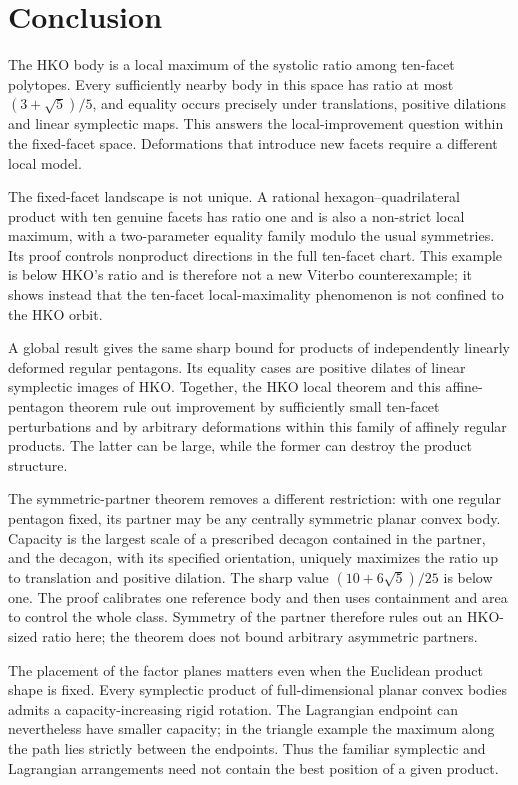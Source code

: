 \clearpage
\section{Conclusion}\label{sec:conclusion}

The HKO body is a local maximum of the systolic ratio among ten-facet
polytopes. Every sufficiently nearby body in this space has ratio at most
$(3+\sqrt5)/5$, and equality occurs precisely under translations, positive
dilations and linear symplectic maps. This answers the local-improvement
question within the fixed-facet space. Deformations that introduce new
facets require a different local model.

The fixed-facet landscape is not unique. A rational hexagon--quadrilateral
product with ten genuine facets has ratio one and is also a non-strict local
maximum, with a two-parameter equality family modulo the usual symmetries.
Its proof controls nonproduct directions in the full ten-facet chart. This
example is below HKO's ratio and is therefore not a new Viterbo counterexample;
it shows instead that the ten-facet local-maximality phenomenon is not confined
to the HKO orbit.

A global result gives the same sharp bound for products of independently
linearly deformed regular pentagons. Its equality cases are positive dilates
of linear symplectic images of HKO. Together, the HKO local theorem and this
affine-pentagon theorem rule out
improvement by sufficiently small ten-facet perturbations and by arbitrary
deformations within this family of affinely regular products. The latter
can be large, while the former can destroy the product structure.

The symmetric-partner theorem removes a different restriction: with one regular
pentagon fixed, its partner may be any centrally symmetric planar convex body.
Capacity is the largest scale of a prescribed decagon contained in the partner,
and the decagon, with its specified orientation, uniquely maximizes the ratio
up to translation and positive dilation. The sharp value $(10+6\sqrt5)/25$ is below one. The proof calibrates
one reference body and then uses containment and area to control the whole
class. Symmetry of the partner therefore rules out an HKO-sized ratio here;
the theorem does not bound arbitrary asymmetric partners.

The placement of the factor planes matters even when the Euclidean product
shape is fixed. Every symplectic product of full-dimensional planar convex
bodies admits a capacity-increasing rigid rotation. The Lagrangian endpoint
can nevertheless have smaller capacity; in the triangle example the maximum
along the path lies strictly between the endpoints. Thus the familiar
symplectic and Lagrangian arrangements need not contain the best position
of a given product.

